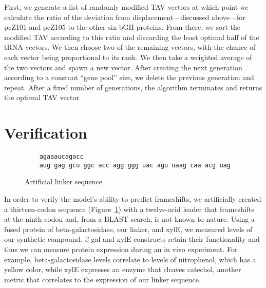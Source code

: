 \documentclass[12pt, draft]{article}
\numberwithin{equation}{section}
\begin{document}
First, we generate a list of randomly modified TAV vectors at which
point we calculate the ratio of the deviation from
displacement---discussed above---for pcZ101 and pcZ105 to the other
six bGH proteins. From there, we sort the modified TAV according to
this ratio and discarding the least optimal half of the tRNA
vectors. We then choose two of the remaining vectors, with the chance
of each vector being proportional to its rank.  We then take a
weighted average of the two vectors and spawn a new vector.  After
creating the next generation according to a constant ``gene pool''
size, we delete the previous generation and repeat. After a fixed
number of generations, the algorithm terminates and returns the
optimal TAV vector.

\section{Verification}
\begin{figure}
  \caption{Artificial linker sequence}
  \label{linker}
  \begin{verbatim}
    agaaaucagacc
    aug gag gcu ggc acc agg ggg uac agu uaag caa acg uag
  \end{verbatim}
\end{figure}

In order to verify the model's ability to predict frameshifts, we
artificially created a thirteen-codon sequence (Figure~\ref{linker})
with a twelve-acid leader that frameshifts at the ninth codon and,
from a BLAST search, is not known to nature.  Using a fused protein of
beta-galactosidase, our linker, and xylE, we measured levels of our
synthetic compound. $\beta$-gal and xylE constructs retain their
functionality and thus we can measure protein expression during an in
vivo experiment. For example, beta-galactosidase levels correlate to
levels of nitrophenol, which has a yellow color, while xylE expresses
an enzyme that cleaves catechol, another metric that correlates to the
expression of our linker sequence.


\begin{singlespace}
  
\end{singlespace}
\end{document}
